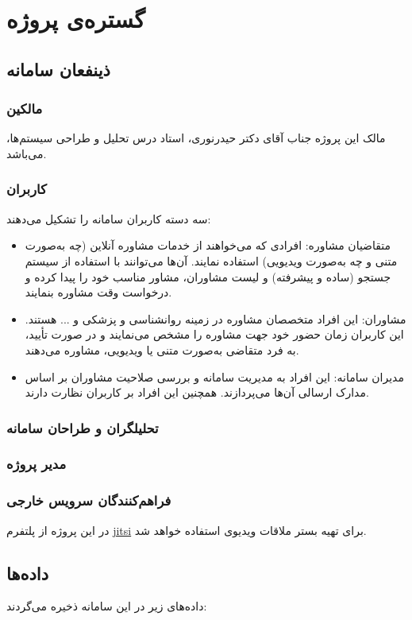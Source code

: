 \section{گستره‌ی پروژه}
\subsection{ذینفعان سامانه}
\subsubsection{مالکین}
مالک این پروژه جناب آقای دکتر حیدرنوری، استاد درس تحلیل و طراحی سیستم‌ها، می‌باشد. 

\subsubsection{کاربران}
سه دسته کاربران سامانه را تشکیل می‌دهند:
\begin{itemize}
\item متقاضیان مشاوره: افرادی که می‌خواهند از خدمات مشاوره آنلاین (چه به‌صورت متنی و چه به‌صورت ویدیویی) استفاده نمایند. آن‌ها می‌توانند با استفاده از سیستم جستجو (ساده و پیشرفته) و لیست مشاوران، مشاور مناسب خود را پیدا کرده و درخواست وقت مشاوره بنمایند.
\item مشاوران: این افراد متخصصان مشاوره در زمینه روانشناسی و پزشکی و ... هستند. این کاربران زمان حضور خود جهت مشاوره را مشخص می‌نمایند و در صورت تأیید، به فرد متقاضی به‌صورت متنی یا ویدیویی، مشاوره می‌دهند. 
\item مدیران سامانه: این افراد به مدیریت سامانه و بررسی صلاحیت مشاوران بر اساس مدارک ارسالی آن‌ها می‌پردازند. همچنین این افراد بر کاربران نظارت دارند.
\end{itemize}
\subsubsection{تحلیلگران و طراحان سامانه}

\subsubsection{مدیر پروژه}

\subsubsection{فراهم‌کنندگان سرویس خارجی}
در این پروژه از پلتفرم \href{https://meet.jit.si/}{jitsi} برای تهیه بستر ملاقات ویدیوی استفاده خواهد شد.

\subsection{داده‌ها}
داده‌های زیر در این سامانه ذخیره می‌گردند:

